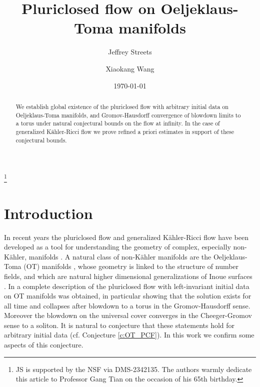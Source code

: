 \documentclass[12pt]{amsart}
\numberwithin{equation}{section}
\numberwithin{prop}{section}
\theoremstyle{definition}
\begin{document}
\title[Pluriclosed flow on Oeljeklaus-Toma manifolds]{Pluriclosed flow on Oeljeklaus-Toma manifolds}

\author{Jeffrey Streets}
\address{Rowland Hall\\
         University of California, Irvine\\
         Irvine, CA 92617}

\author{Xiaokang Wang}
\address{Rowland Hall\\
         University of California, Irvine\\
         Irvine, CA 92617}

\date{\today}

\begin{abstract} We establish global existence of the pluriclosed flow with arbitrary initial data on Oeljeklaus-Toma manifolds, and Gromov-Hausdorff convergence of blowdown limits to a torus under natural conjectural bounds on the flow at infinity.  In the case of generalized K\"ahler-Ricci flow we prove refined a priori estimates in support of these conjectural bounds.
\end{abstract}

\thanks{JS is supported by the NSF via DMS-2342135.  The authors warmly dedicate this article to Professor Gang Tian on the occasion of his 65th birthday.}

\maketitle

%
%
%
%
\section{Introduction}
%
%
%
%

In recent years the pluriclosed flow \cite{PCF, PCFReg} and generalized K\"ahler-Ricci flow \cite{apostolov2022generalized,StreetsSTB,GKRF} have been developed as a tool for understanding the geometry of complex, especially non-K\"ahler, manifolds \cite{barbaro2023bismut,barbaro2025global,barbaro2025pluriclosed,fino2024pluriclosed,fusi2024pluriclosed,garcia2023non, ye2024pluriclosed}.  A natural class of non-K\"ahler manifolds are the Oeljeklaus-Toma (OT) manifolds \cite{oeljeklaus2005non}, whose geometry is linked to the structure of number fields, and which are natural higher dimensional generalizations of Inoue surfaces \cite{inoue1974surfaces}.  In \cite{fusi2024pluriclosed} a complete description of the pluriclosed flow with left-invariant initial data on OT manifolds was obtained, in particular showing that the solution exists for all time and collapses after blowdown to a torus in the Gromov-Hausdorff sense.  Moreover the blowdown on the universal cover converges in the Cheeger-Gromov sense to a soliton.  It is natural to conjecture that these statements hold for arbitrary initial data (cf. Conjecture \ref{c:OT_PCF}).  In this work we confirm some aspects of this conjecture.  
\end{document}
